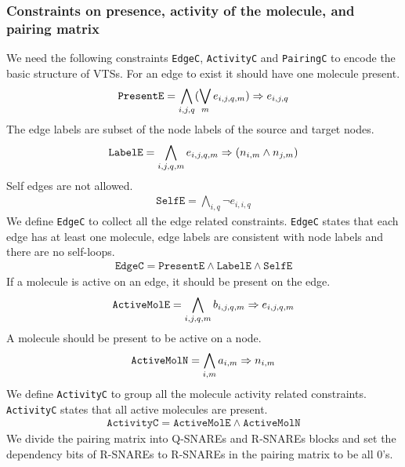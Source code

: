 \subsubsection{Constraints on presence, activity of the molecule, and pairing matrix}
%
We need the following constraints \texttt{EdgeC},
\texttt{ActivityC} and \texttt{PairingC} to encode the basic structure of VTSs.
%
For an edge to exist it should have one molecule present. 
%
\begin{align*}
  \texttt{PresentE} = \bigwedge\limits_{i,j,q} (\bigvee_m e_{i,j,q,m} )\Rightarrow e_{i,j,q}
\end{align*}
The edge labels are subset of the node labels of the source and target nodes.
\begin{align*}
  \texttt{LabelE} = \bigwedge\limits_{i,j,q,m} e_{i,j,q,m} \Rightarrow (n_{i,m} \land n_{j,m} )
\end{align*}
Self edges are not allowed. 
\begin{align*}
  \texttt{SelfE} = \bigwedge\limits_{i,q} \neg e_{i,i,q}
\end{align*}
\noindent We define \texttt{EdgeC} to collect all the edge related constraints. 
%
\texttt{EdgeC} states that each edge has at least one molecule,
 edge labels are consistent with node labels and there are no self-loops.    
\begin{align*}
  \texttt{EdgeC} = \texttt{PresentE} \land \texttt{LabelE}  \land \texttt{SelfE} 
\end{align*}
\noindent If a molecule is active on an edge, it should be present on the edge.
%
\begin{align*}
  \texttt{ActiveMolE} = \bigwedge\limits_{i,j,q,m} b_{i,j,q,m} \Rightarrow e_{i,j,q,m}\label{eq:f1}
\end{align*}
A molecule should be present to be active on a node.  
\begin{align*}
    \texttt{ActiveMolN} = \bigwedge\limits_{i,m} a_{i,m} \Rightarrow n_{i,m}
\end{align*}
\noindent We define \texttt{ActivityC} to group all the molecule activity related constraints. 
\texttt{ActivityC} states that all active molecules are present.
\begin{align*}
  \texttt{ActivityC} = \texttt{ActiveMolE} \land \texttt{ActiveMolN} 
\end{align*}
\noindent We divide the pairing matrix into Q-SNAREs and R-SNAREs blocks and set the dependency bits of R-SNAREs to R-SNAREs in the pairing matrix to be all 0's.

